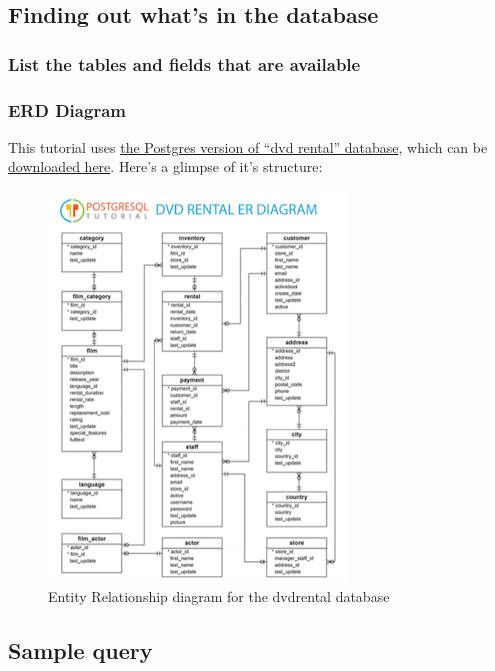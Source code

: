 \documentclass[]{book}
\theoremstyle{definition}
\theoremstyle{definition}
\theoremstyle{definition}
\theoremstyle{remark}
\begin{document}
\hypertarget{finding-out-whats-in-the-database}{%
\subsection{Finding out what's in the
database}\label{finding-out-whats-in-the-database}}

\hypertarget{list-the-tables-and-fields-that-are-available}{%
\subsubsection{List the tables and fields that are
available}\label{list-the-tables-and-fields-that-are-available}}

\hypertarget{erd-diagram}{%
\subsubsection{ERD Diagram}\label{erd-diagram}}

This tutorial uses
\href{http://www.postgresqltutorial.com/postgresql-sample-database/}{the
Postgres version of ``dvd rental'' database}, which can be
\href{http://www.postgresqltutorial.com/wp-content/uploads/2017/10/dvdrental.zip}{downloaded
here}. Here's a glimpse of it's structure:

\begin{figure}
\centering
\includegraphics{./screenshots/dvdrental-er-diagram.png}
\caption{Entity Relationship diagram for the dvdrental database}
\end{figure}

\hypertarget{sample-query}{%
\subsection{Sample query}\label{sample-query}}
\end{document}
